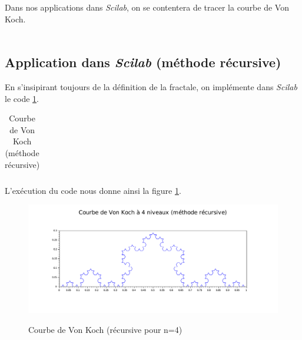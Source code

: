 \documentclass[a4paper,10pt]{report}
\begin{document}
Dans nos applications dans \textit{Scilab}, on se contentera de tracer la courbe de Von Koch. \\ \\

\subsection{Application dans \textit{Scilab} (méthode récursive)}
En s'insipirant toujours de la définition de la fractale, on implémente dans \textit{Scilab} le code \ref{code_koch}.
\begin{table}[H]
\caption{Courbe de Von Koch (méthode récursive)}
\begin{tabular}{l}
\\
\end{tabular}
\label{code_koch}
\end{table}
\newpage
L'exécution du code nous donne ainsi la figure \ref{koch_recursif}.
\begin{figure}[H]
\centering
\caption{Courbe de Von Koch (récursive pour n=4)}
\includegraphics[width=\textwidth]{koch_recursif.pdf}
\label{koch_recursif}
\end{figure}
\end{document}
